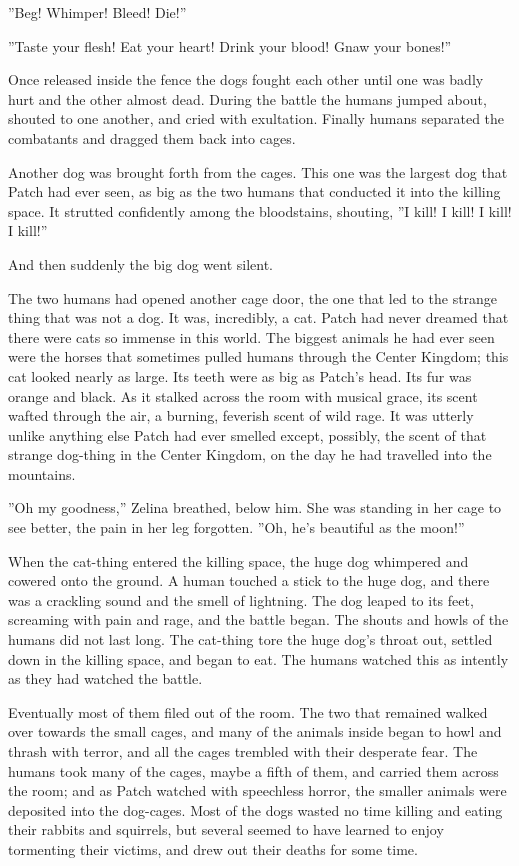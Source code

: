 \documentclass[12pt]{book}
\begin{document}
 ''Beg! Whimper! Bleed! Die!''\par
 ''Taste your flesh! Eat your heart! Drink your blood! Gnaw your bones!''\par
 Once released inside the fence the dogs fought each other until one was badly hurt and the other almost dead. During the battle the humans jumped about, shouted to one another, and cried with exultation. Finally humans separated the combatants and dragged them back into cages. \par
Another dog was brought forth from the cages. This one was the largest dog that Patch had ever seen, as big as the two humans that conducted it into the killing space. It strutted confidently among the bloodstains, shouting, ''I kill! I kill! I kill! I kill!''\par
 And then suddenly the big dog went silent.\par
The two humans had opened another cage door, the one that led to the strange thing that was not a dog. It was, incredibly, a cat. Patch had never dreamed that there were cats so immense in this world. The biggest animals he had ever seen were the horses that sometimes pulled humans through the Center Kingdom; this cat looked nearly as large. Its teeth were as big as Patch's head. Its fur was orange and black. As it stalked across the room with musical grace, its scent wafted through the air, a burning, feverish scent of wild rage. It was utterly unlike anything else Patch had ever smelled %
 except, possibly, the scent of that strange dog-thing in the Center Kingdom, on the day he had travelled into the mountains.\par
 ''Oh my goodness,'' Zelina breathed, below him. She was standing in her cage to see better, the pain in her leg forgotten. ''Oh, he's beautiful as the moon!''\par
 When the cat-thing entered the killing space, the huge dog whimpered and cowered onto the ground. A human touched a stick to the huge dog, and there was a crackling sound and the smell of lightning. The dog leaped to its feet, screaming with pain and rage, and the battle began. The shouts and howls of the humans did not last long. The cat-thing tore the huge dog's throat out, settled down in the killing space, and began to eat. The humans watched this as intently as they had watched the battle.\par
 Eventually most of them filed out of the room. The two that remained walked over towards the small cages, and many of the animals inside began to howl and thrash with terror, and all the cages trembled with their desperate fear. The humans took many of the cages, maybe a fifth of them, and carried them across the room; and as Patch watched with speechless horror, the smaller animals were deposited into the dog-cages. Most of the dogs wasted no time killing and eating their rabbits and squirrels, but several seemed to have learned to enjoy tormenting their victims, and drew out their deaths for some time.\par
\end{document}
